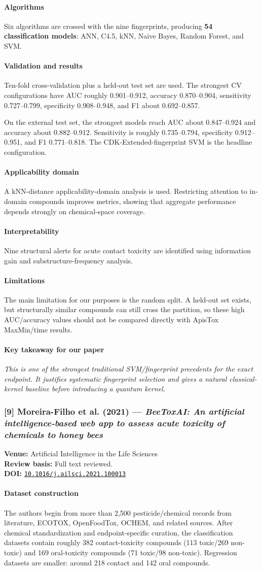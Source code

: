 \documentclass[11pt]{article}
\newcommand{\reviewfield}[2]{\paragraph{#1}#2}
\newcommand{\keytakeaway}[1]{\paragraph{Key takeaway for our paper}\emph{#1}}
\newcommand{\paperdoi}[1]{\href{https://doi.org/#1}{\texttt{#1}}}
\begin{document}
\reviewfield{Algorithms}{
Six algorithms are crossed with the nine fingerprints, producing \textbf{54 classification models}: ANN, C4.5, kNN, Naive Bayes, Random Forest, and SVM.
}

\reviewfield{Validation and results}{
Ten-fold cross-validation plus a held-out test set are used. The strongest CV configurations have AUC roughly 0.901--0.912, accuracy 0.870--0.904, sensitivity 0.727--0.799, specificity 0.908--0.948, and F1 about 0.692--0.857.

On the external test set, the strongest models reach AUC about 0.847--0.924 and accuracy about 0.882--0.912. Sensitivity is roughly 0.735--0.794, specificity 0.912--0.951, and F1 0.771--0.818. The CDK-Extended-fingerprint SVM is the headline configuration.
}

\reviewfield{Applicability domain}{
A kNN-distance applicability-domain analysis is used. Restricting attention to in-domain compounds improves metrics, showing that aggregate performance depends strongly on chemical-space coverage.
}

\reviewfield{Interpretability}{
Nine structural alerts for acute contact toxicity are identified using information gain and substructure-frequency analysis.
}

\reviewfield{Limitations}{
The main limitation for our purposes is the random split. A held-out set exists, but structurally similar compounds can still cross the partition, so these high AUC/accuracy values should not be compared directly with ApisTox MaxMin/time results.
}

\keytakeaway{This is one of the strongest traditional SVM/fingerprint precedents for the exact endpoint. It justifies systematic fingerprint selection and gives a natural classical-kernel baseline before introducing a quantum kernel.}

\subsubsection{[9] Moreira-Filho et al. (2021) --- \textit{BeeToxAI: An artificial intelligence-based web app to assess acute toxicity of chemicals to honey bees}}
\textbf{Venue:} Artificial Intelligence in the Life Sciences\\
\textbf{Review basis:} Full text reviewed.\\
\textbf{DOI:} \paperdoi{10.1016/j.ailsci.2021.100013}

\reviewfield{Dataset construction}{
The authors begin from more than 2,500 pesticide/chemical records from literature, ECOTOX, OpenFoodTox, OCHEM, and related sources. After chemical standardization and endpoint-specific curation, the classification datasets contain roughly 382 contact-toxicity compounds (113 toxic/269 non-toxic) and 169 oral-toxicity compounds (71 toxic/98 non-toxic). Regression datasets are smaller: around 218 contact and 142 oral compounds.
}
\end{document}

